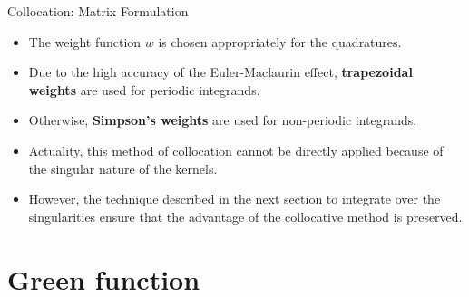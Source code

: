 \documentclass[8pt]{beamer}
\begin{document}
\begin{frame}{\color{white} Collocation: Matrix Formulation}
\begin{itemize}
    \item The weight function $w$ is chosen appropriately for the quadratures.
    \item Due to the high accuracy of the Euler-Maclaurin effect, \textbf{trapezoidal weights} are used for periodic integrands.
    \item Otherwise, \textbf{Simpson's weights} are used for non-periodic integrands.
    \item Actuality, this method of collocation cannot be directly applied because of the singular nature of the kernels. 
    \item However, the technique described in the next section to integrate over the singularities ensure that the advantage of the collocative method is preserved.
\end{itemize}
\end{frame}

\section{Green function}
\end{document}
